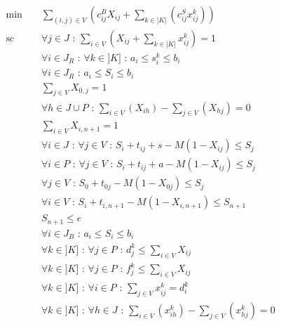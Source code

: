 \documentclass[12pt,a4paper,fleqn]{article}
\begin{document}
\begin{align}
& \text{min } && \sum \limits_{(i,j) \in V} (c^B_{ij}X_{ij} + \sum \limits_{k \in ]K]}( c^S_{ij}x^k_{ij})) \\[10pt]
& \text{sc }  && \forall j \in J \text{ : } \sum \limits_{i \in V}( X_{ij} + \sum \limits_{k \in ]K]} x^k_{ij} ) = 1 \label{tousservis} \\
& && \forall i \in J_R \text{ : } \forall k \in ]K] \text{ : } a_i \leqslant s_i^k \leqslant b_i \label{fenetrerestant1} \\
& && \forall i \in J_R \text{ : } a_i \leqslant S_i \leqslant b_i \label{fenetrerestant2} \\[30pt]
& && \sum \limits_{j \in V} X_{0,j} = 1 \label{partirdudepot} \\
& && \forall h \in J \cup P \text{ : } \sum \limits_{i \in V} (X_{ih}) - \sum \limits_{j \in V} (X_{hj}) = 0 \label{flotgros} \\
& && \sum \limits_{i \in V} X_{i,n+1} = 1 \label{reveniraudepot} \\
& && \forall i \in J \text{ : } \forall j \in V \text{ : } S_i + t_{ij} + s - M(1-X_{ij}) \leqslant S_j \label{sequentialitegros1} \\
& && \forall i \in P \text{ : } \forall j \in V \text{ : } S_i + t_{ij} + a - M(1-X_{ij}) \leqslant S_j \label{sequentialitegros2} \\
& && \forall j \in V \text{ : } S_0 + t_{0j} - M(1-X_{0j}) \leqslant S_j \label{sequentialitegros3} \\
& && \forall i \in V \text{ : } S_i + t_{i,n+1} - M(1-X_{i,n+1}) \leqslant S_{n+1} \label{sequentialitegros4} \\
& && S_{n+1} \leqslant e \label{findejournee} \\
& && \forall i \in J_B \text{ : } a_i \leqslant S_i \leqslant b_i \label{fenetregros} \\[30pt]
& && \forall k \in ]K] \text{ : } \forall j \in P \text{ : } d^k_j \leqslant \sum \limits_{i \in V} X_{ij} \label{separationvalide} \\
& && \forall k \in ]K] \text{ : } \forall j \in P \text{ : } f^k_j \leqslant \sum \limits_{i \in V} X_{ij} \label{mergevalide} \\
& && \forall k \in ]K] \text{ : } \forall i \in P \text{ : } \sum \limits_{j \in V} x^k_{ij} = d^k_i \label{partirdugros} \\
& && \forall k \in ]K] \text{ : } \forall h \in J \text{ : } \sum \limits_{i \in V} (x_{ih}^k) - \sum \limits_{j \in V} (x_{hj}^k) = 0 \label{flotpetit} \\

\end{align}
\end{document}
